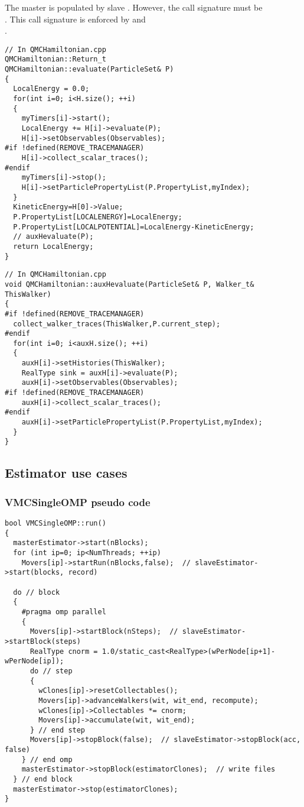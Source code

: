 The master  is populated by slave 
. However, the call signature must be 
 \\. This call signature is enforced by  and  \\.

\begin{lstlisting}
// In QMCHamiltonian.cpp
QMCHamiltonian::Return_t
QMCHamiltonian::evaluate(ParticleSet& P)
{
  LocalEnergy = 0.0;
  for(int i=0; i<H.size(); ++i)
  {
    myTimers[i]->start();
    LocalEnergy += H[i]->evaluate(P);
    H[i]->setObservables(Observables);
#if !defined(REMOVE_TRACEMANAGER)
    H[i]->collect_scalar_traces();
#endif
    myTimers[i]->stop();
    H[i]->setParticlePropertyList(P.PropertyList,myIndex);
  }
  KineticEnergy=H[0]->Value;
  P.PropertyList[LOCALENERGY]=LocalEnergy;
  P.PropertyList[LOCALPOTENTIAL]=LocalEnergy-KineticEnergy;
  // auxHevaluate(P);
  return LocalEnergy;
}
\end{lstlisting}

\begin{lstlisting}
// In QMCHamiltonian.cpp
void QMCHamiltonian::auxHevaluate(ParticleSet& P, Walker_t& ThisWalker)
{
#if !defined(REMOVE_TRACEMANAGER)
  collect_walker_traces(ThisWalker,P.current_step);
#endif
  for(int i=0; i<auxH.size(); ++i)
  {
    auxH[i]->setHistories(ThisWalker);
    RealType sink = auxH[i]->evaluate(P);
    auxH[i]->setObservables(Observables);
#if !defined(REMOVE_TRACEMANAGER)
    auxH[i]->collect_scalar_traces();
#endif
    auxH[i]->setParticlePropertyList(P.PropertyList,myIndex);
  }
}
\end{lstlisting}

\subsection{Estimator use cases}

\subsubsection{VMCSingleOMP pseudo code}
\begin{lstlisting}
bool VMCSingleOMP::run()
{
  masterEstimator->start(nBlocks);
  for (int ip=0; ip<NumThreads; ++ip)
    Movers[ip]->startRun(nBlocks,false);  // slaveEstimator->start(blocks, record)
  
  do // block
  {
    #pragma omp parallel
    {
      Movers[ip]->startBlock(nSteps);  // slaveEstimator->startBlock(steps)
      RealType cnorm = 1.0/static_cast<RealType>(wPerNode[ip+1]-wPerNode[ip]);
      do // step
      {
        wClones[ip]->resetCollectables();
        Movers[ip]->advanceWalkers(wit, wit_end, recompute);
        wClones[ip]->Collectables *= cnorm;
        Movers[ip]->accumulate(wit, wit_end);
      } // end step
      Movers[ip]->stopBlock(false);  // slaveEstimator->stopBlock(acc, false)
    } // end omp
    masterEstimator->stopBlock(estimatorClones);  // write files
  } // end block
  masterEstimator->stop(estimatorClones);
}
\end{lstlisting}

